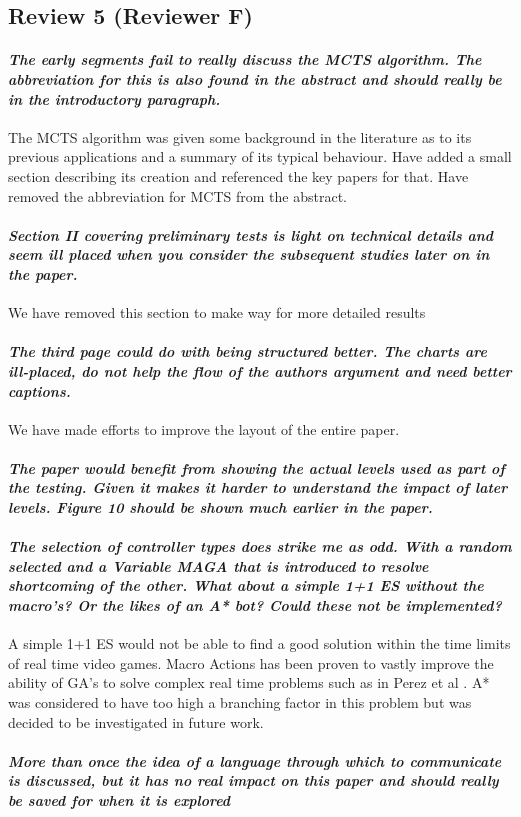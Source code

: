 \documentclass{article}
\begin{document}
\subsection{Review 5 (Reviewer F)}
\paragraph*{\textit{The early segments fail to really discuss the MCTS algorithm.  The abbreviation for this is also found in the abstract and should really be in the introductory paragraph.}}
The MCTS algorithm was given some background in the literature as to its previous applications and a summary of its typical behaviour. Have added a small section describing its creation and referenced the key papers for that.
Have removed the abbreviation for MCTS from the abstract.
\paragraph*{\textit{Section II covering preliminary tests is light on technical details and seem ill placed when you consider the subsequent studies later on in the paper.}}
We have removed this section to make way for more detailed results
\paragraph*{\textit{The third page could do with being structured better.  The charts are ill-placed, do not help the flow of the authors argument and need better captions.}}
We have made efforts to improve the layout of the entire paper.
\paragraph*{\textit{The paper would benefit from showing the actual levels used as part of the testing.  Given it makes it harder to understand the impact of later levels.  Figure 10 should be shown much earlier in the paper.}}
\paragraph*{\textit{The selection of controller types does strike me as odd.  With a random selected and a Variable MAGA that is introduced to resolve shortcoming of the other.  What about a simple 1+1 ES without the macro's?  Or the likes of an A* bot?  Could these not be implemented?}}
A simple 1+1 ES would not be able to find a good solution within the time limits of real time video games. Macro Actions has been proven to vastly improve the ability of GA's to solve complex real time problems such as in Perez et al \cite{perez2013rolling}. A* was considered to have too high a branching factor in this problem but was decided to be investigated in future work.
\paragraph*{\textit{More than once the idea of a language through which to communicate is discussed, but it has no real impact on this paper and should really be saved for when it is explored}}



\end{document}
